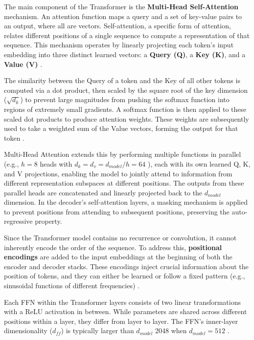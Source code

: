 The main component of the Transformer is the \textbf{Multi-Head Self-Attention} mechanism. An attention function maps a query and a set of key-value pairs to an output, where all are vectors. Self-attention, a specific form of attention, relates different positions of a single sequence to compute a representation of that sequence. This mechanism operates by linearly projecting each token's input embedding into three distinct learned vectors: a \textbf{Query (Q)}, a \textbf{Key (K)}, and a \textbf{Value (V)} \cite{vaswani2017_attention_is_all}. 

The similarity between the Query of a token and the Key of all other tokens is computed via a dot product, then scaled by the square root of the key dimension ($\sqrt{d_k}$) to prevent large magnitudes from pushing the softmax function into regions of extremely small gradients. A softmax function is then applied to these scaled dot products to produce attention weights. These weights are subsequently used to take a weighted sum of the Value vectors, forming the output for that token \cite{jm3_llm_book, vaswani2017_attention_is_all}. 

Multi-Head Attention extends this by performing multiple functions in parallel (e.g., $h=8$ heads with $d_k=d_v=d_{model}/h=64$ \cite{vaswani2017_attention_is_all}), each with its own learned Q, K, and V projections, enabling the model to jointly attend to information from different representation subspaces at different positions. The outputs from these parallel heads are concatenated and linearly projected back to the $d_{model}$ dimension. In the decoder's self-attention layers, a masking mechanism is applied to prevent positions from attending to subsequent positions, preserving the auto-regressive property.

Since the Transformer model contains no recurrence or convolution, it cannot inherently encode the order of the sequence. To address this, \textbf{positional encodings} are added to the input embeddings at the beginning of both the encoder and decoder stacks. These encodings inject crucial information about the position of tokens, and they can either be learned or follow a fixed pattern (e.g., sinusoidal functions of different frequencies) \cite{jm3_llm_book, vaswani2017_attention_is_all}.


Each FFN within the Transformer layers consists of two linear transformations with a ReLU activation in between. While parameters are shared across different positions within a layer, they differ from layer to layer. The FFN's inner-layer dimensionality ($d_{ff}$) is typically larger than $d_{model}$ 2048 when $d_{model}=512$ \cite{jm3_llm_book}.


